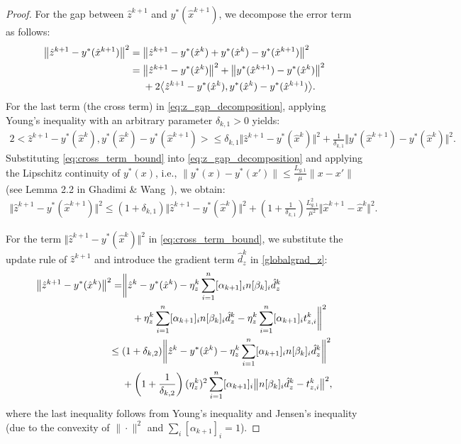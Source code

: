 \documentclass{article}
\theoremstyle{plain}
\theoremstyle{definition}
\theoremstyle{remark}
\begin{document}
\begin{proof}
For the gap between $\hat{z}^{k+1}$ and $y^*(\hat{x}^{k+1})$, we decompose the error term as follows:
\begin{align}\label{eq:z_gap_decomposition}
    \big\Vert\hat{z}^{k+1}-y^*(\hat{x}^{k+1})\big\Vert^2 ={}& \big\Vert\hat{z}^{k+1}-y^*(\hat{x}^{k}) + y^*(\hat{x}^{k}) - y^*(\hat{x}^{k+1})\big\Vert^2 \notag \\
    ={}& \big\Vert\hat{z}^{k+1}-y^*(\hat{x}^{k})\big\Vert^{2} + \big\Vert y^*(\hat{x}^{k+1})-y^*(\hat{x}^{k})\big\Vert^{2} \notag \\
    &+ 2\big<\hat{z}^{k+1}-y^*(\hat{x}^{k}), y^*(\hat{x}^{k})-y^*(\hat{x}^{k+1})\big>.
\end{align}
For the last term (the cross term) in \eqref{eq:z_gap_decomposition}, applying Young's inequality with an arbitrary parameter $\delta_{k,1} > 0$ yields:
\begin{align}\label{eq:cross_term_bound}
    2\big<\hat{z}^{k+1}-y^*(\hat{x}^{k}), y^*(\hat{x}^{k})-y^*(\hat{x}^{k+1})\big> \leq \delta_{k,1} \big\Vert\hat{z}^{k+1}-y^*(\hat{x}^{k})\big\Vert^{2} + \frac{1}{\delta_{k,1}}\big\Vert y^*(\hat{x}^{k+1})-y^*(\hat{x}^{k})\big\Vert^{2}.
\end{align}
Substituting \eqref{eq:cross_term_bound} into \eqref{eq:z_gap_decomposition} and applying the Lipschitz continuity of $y^*(x)$, i.e., $\|y^*(x) - y^*(x')\| \le \frac{L_{g,1}}{\mu}\|x-x'\|$ (see Lemma 2.2 in Ghadimi \& Wang~), we obtain:
\begin{align}\label{eq:cross_term_bound_1}
    \big\Vert\hat{z}^{k+1}-y^*(\hat{x}^{k+1})\big\Vert^2
    \leq (1+\delta_{k,1})\big\Vert\hat{z}^{k+1}-y^*(\hat{x}^{k})\big\Vert^{2} + \left(1+\frac{1}{\delta_{k,1}}\right)\frac{L_{g,1}^2}{\mu^2}\big\Vert \hat{x}^{k+1}-\hat{x}^{k}\big\Vert^{2}.
\end{align}
	
	For the term $\big\Vert\hat{z}^{k+1}-y^*(\hat{x}^{k})\big\Vert^{2}$ in \eqref{eq:cross_term_bound}, we substitute the update rule of $\hat{z}^{k+1}$ and introduce the gradient term $\hat{d}_z^k$ in \eqref{globalgrad_z}:
\begin{align}\label{eq:z_descent_decomposition_1}
    \big\Vert\hat{z}^{k+1}-y^*(\hat{x}^{k})\big\Vert^{2}  
    = & \bigg\Vert \hat{z}^{k}- y^*(\hat{x}^{k}) - \eta_z^{k}\sum_{i=1}^{n}[\alpha_{k+1}]_{i}n[\beta_{k}]_{i}\hat{d}_{z}^{k} \notag \\
    &\quad + \eta_z^{k}\sum_{i=1}^{n}[\alpha_{k+1}]_{i}n[\beta_{k}]_{i}\hat{d}_{z}^{k} - \eta_z^{k}\sum_{i=1}^n[\alpha_{k+1}]_i t_{z,i}^k \bigg\Vert^{2} \notag \\
    \leq{} & (1+\delta_{k,2}) \bigg\Vert \hat{z}^{k}- y^*(\hat{x}^{k}) - \eta_z^{k}\sum_{i=1}^{n}[\alpha_{k+1}]_{i}n[\beta_{k}]_{i}\hat{d}_{z}^{k} \bigg\Vert^{2} \notag \\
    &+ \left(1+\frac{1}{\delta_{k,2}}\right)(\eta_z^{k})^{2} \sum_{i=1}^{n}[\alpha_{k+1}]_{i} \big\Vert n[\beta_{k}]_{i}\hat{d}_{z}^{k}- t_{z,i}^{k} \big\Vert^{2},
\end{align}
where the last inequality follows from Young's inequality and Jensen's inequality (due to the convexity of $\|\cdot\|^2$ and $\sum_{i}[\alpha_{k+1}]_i = 1$).


\end{proof}
\end{document}
